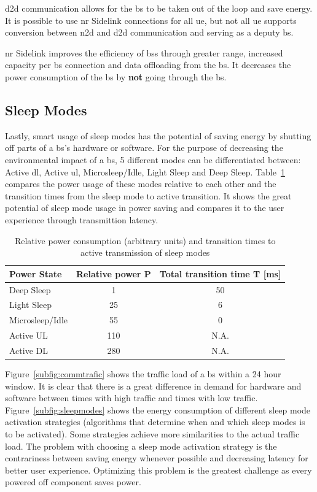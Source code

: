 \documentclass[11pt,a4paper]{article}
\begin{document}
\acrlong{d2d} communication allows for the \acrshort{bs} to be taken out of the loop and save energy.
It is possible to use \acrshort{nr} Sidelink connections for all \acrlong{ue}, but not all \acrshort{ue} supports conversion between \acrshort{n2d} and \acrshort{d2d} communication and serving as a deputy \acrshort{bs}.

\acrshort{nr} Sidelink improves the efficiency of \acrlong{bs}s through greater range, increased capacity per \acrshort{bs} connection and data offloading from the \acrshort{bs}.
It decreases the power consumption of the \acrshort{bs} by \textbf{not} going through the \acrshort{bs}.

\subsection{Sleep Modes}\label{subsec:sleep}
Lastly, smart usage of sleep modes has the potential of saving energy by shutting off parts of a \acrshort{bs}'s hardware or software.
For the purpose of decreasing the environmental impact of a \acrshort{bs}, 5 different modes can be differentiated between: Active \acrshort{dl}, Active \acrshort{ul}, Microsleep/Idle, Light Sleep and Deep Sleep.
Table~\ref{tab:sleeppower} compares the power usage of these modes relative to each other and the transition times from the sleep mode to active transition.
It shows the great potential of sleep mode usage in power saving and compares it to the user experience through transmittion latency.

\begin{table}[t]
  \begin{tabular}{lcc}
    Power State     & Relative power P & Total transition time T [ms] \\
    \hline
    Deep Sleep      & 1   & 50   \\
    Light Sleep     & 25  & 6    \\
    Microsleep/Idle & 55  & 0    \\
    Active UL       & 110 & N.A. \\
    Active DL       & 280 & N.A. \\
  \end{tabular}
  \caption{Relative power consumption (arbitrary units) and transition times to active transmission of sleep modes \citep{energymodeling}}\label{tab:sleeppower}
\end{table}

Figure~\ref{subfig:commtrafic} shows the traffic load of a \acrshort{bs} within a 24 hour window.
It is clear that there is a great difference in demand for hardware and software between times with high traffic and times with low traffic.
Figure~\ref{subfig:sleepmodes} shows the energy consumption of different sleep mode activation strategies (algorithms that determine when and which sleep modes is to be activated).
Some strategies achieve more similarities to the actual traffic load.
The problem with choosing a sleep mode activation strategy is the contrariness between saving energy whenever possible and decreasing latency for better user experience.
Optimizing this problem is the greatest challenge as every powered off component saves power.
\end{document}
